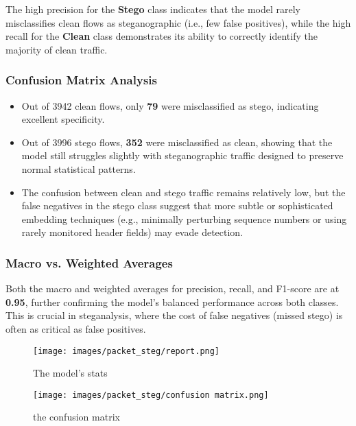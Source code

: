 \documentclass[12pt]{article}
\begin{document}
\vspace{0.3cm}
The high precision for the \textbf{Stego} class indicates that the model rarely misclassifies clean flows as steganographic (i.e., few false positives), while the high recall for the \textbf{Clean} class demonstrates its ability to correctly identify the majority of clean traffic.

\subsubsection*{Confusion Matrix Analysis}

\begin{itemize}
    \item Out of 3942 clean flows, only \textbf{79} were misclassified as stego, indicating excellent specificity.
    \item Out of 3996 stego flows, \textbf{352} were misclassified as clean, showing that the model still struggles slightly with steganographic traffic designed to preserve normal statistical patterns.
    \item The confusion between clean and stego traffic remains relatively low, but the false negatives in the stego class suggest that more subtle or sophisticated embedding techniques (e.g., minimally perturbing sequence numbers or using rarely monitored header fields) may evade detection.
\end{itemize}

\subsubsection*{Macro vs. Weighted Averages}
Both the macro and weighted averages for precision, recall, and F1-score are at \textbf{0.95}, further confirming the model’s balanced performance across both classes. This is crucial in steganalysis, where the cost of false negatives (missed stego) is often as critical as false positives.





\begin{figure}[h]
    \centering
    \begin{minipage}[b]{0.45\textwidth}
        \centering
        \texttt{[image: images/packet\_steg/report.png]}
        \caption{The model's stats}
    \end{minipage}
    \hfill
    \begin{minipage}[b]{0.45\textwidth}
        \centering
        \texttt{[image: images/packet\_steg/confusion matrix.png]}
        \caption{the confusion matrix}
    \end{minipage}
\end{figure}
\end{document}
